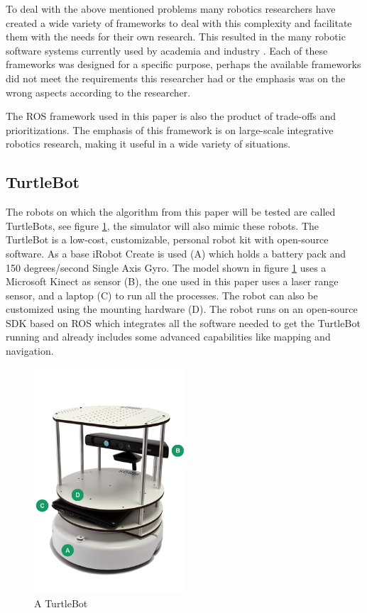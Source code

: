 \documentclass{ba-kecs}
\begin{document}
To deal with the above mentioned problems many robotics researchers have created a wide variety of frameworks to deal with this complexity and facilitate them with the needs for their own research. This resulted in the many robotic software systems currently used by academia and industry \cite{Kramer}. Each of these frameworks was designed for a specific purpose, perhaps the available frameworks did not meet the requirements this researcher had or the emphasis was on the wrong aspects according to the researcher.

The ROS framework used in this paper is also the product of trade-offs and prioritizations. The emphasis of this framework is on large-scale integrative robotics research, making it useful in a wide variety of situations.

\subsection{TurtleBot}
The robots on which the algorithm from this paper will be tested are called TurtleBots, see figure \ref{fig:turtlebot}, the simulator will also mimic these robots. The TurtleBot is a low-cost, customizable, personal robot kit with open-source software. As a base iRobot Create is used (A) which holds a battery pack and 150 degrees/second Single Axis Gyro. The model shown in figure  \ref{fig:turtlebot} uses a Microsoft Kinect as sensor (B), the one used in this paper uses a laser range sensor, and a laptop (C) to run all the processes. The robot can also be customized using the mounting hardware (D). The robot runs on an open-source SDK based on ROS which integrates all the software needed to get the TurtleBot running and already includes some advanced capabilities like mapping and navigation.

\begin{figure}[h]
	\centering
		\includegraphics[width=0.50\textwidth]{figures/turtlebot.png}
	\caption{A TurtleBot}
	\label{fig:turtlebot}
\end{figure}
\end{document}
